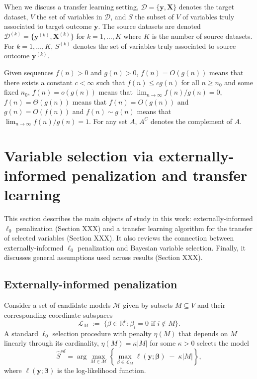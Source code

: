 \documentclass[
  12pt]{article}
\newcommand{\R}{\mathbb{R}}
\newcommand{\M}{\mathcal{M}}
\newcommand{\by}{\mathbf{y}}
\newcommand{\bbeta}{\boldsymbol{\beta}}
\newcommand{\bX}{\mathbf{X}}
\begin{document}
When we discuss a transfer learning setting, $\mathcal{D}=\{\by,\bX\}$ denotes the target dataset, $V$ the set of variables in $\mathcal{D}$, and $S$ the subset of $V$ of variables truly associated to target outcome $\by$. The source datasets are denoted $\mathcal{D}^{(k)}=\{\by^{(k)},\bX^{(k)}\}$ for $k=1,\ldots,K$ where $K$ is the number of source datasets. For $k=1,\ldots,K$, $S^{(k)}$ denotes the set of variables truly associated to source outcome $\by^{(k)}$.

Given sequences $f(n) > 0$ and $g(n) >0$, $f(n)=O(g(n))$ means that there exists a constant $c<\infty$ such that $f(n) \leq c g(n)$ for all $n \geq n_0$ and some fixed $n_0$, $f(n)=o(g(n))$ means that $\lim_{n\to\infty}f(n)/g(n)=0$, $f(n)=\Theta(g(n))$ means that $f(n) = O(g(n))$ and $g(n) = O(f(n))$ and $f(n)\sim g(n)$ means that $\lim_{n\to\infty}f(n)/g(n)=1$. For any set $A$, $A^C$ denotes the complement of $A$.

\section{Variable selection via externally-informed penalization and transfer learning}\label{sec:intro_blockpen} 

This section describes the main objects of study in this work: externally-informed $\ell_0$ penalization (Section XXX) and a transfer learning algorithm for the transfer of selected variables (Section XXX). It also reviews the connection between externally-informed $\ell_0$ penalization and Bayesian variable selection. Finally, it discusses general assumptions used across results (Section XXX).

\subsection{Externally-informed  penalization}\label{ssec:intro_blockpen}

Consider a set of candidate models $\M$ given by subsets $M\subseteq V$ and their corresponding coordinate subspaces 
$$
\mathcal{L}_M\;:=\;\{\beta\in \R^p: \beta_i=0\mbox{ if }i\notin M\}.
$$
A standard $\ell_0$ selection procedure with penalty $\eta(M)$ that depends on $M$ linearly through its cardinality, $\eta(M)=\kappa |M|$ for some $\kappa>0$ selects the model
\begin{equation}\label{eq:stdl0}
\hat{S}^{sd}= \arg\max_{M\in \M} \left\{\max_{\beta\in \mathcal{L}_M}\ell(\by; \bbeta)\;-\;\kappa |M|\right\},
\end{equation}
where $\ell(\by; \bbeta)$ is the log-likelihood function. 
\end{document}
